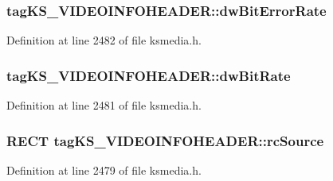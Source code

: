 \subsubsection[{\texorpdfstring{dw\+Bit\+Error\+Rate}{dwBitErrorRate}}]{ tag\+K\+S\+\_\+\+V\+I\+D\+E\+O\+I\+N\+F\+O\+H\+E\+A\+D\+E\+R\+::dw\+Bit\+Error\+Rate}\hypertarget{structtag_k_s___v_i_d_e_o_i_n_f_o_h_e_a_d_e_r_a61ee8d4ae605761206b2f35175e036ac}{}\label{structtag_k_s___v_i_d_e_o_i_n_f_o_h_e_a_d_e_r_a61ee8d4ae605761206b2f35175e036ac}


Definition at line 2482 of file ksmedia.\+h.

\subsubsection[{\texorpdfstring{dw\+Bit\+Rate}{dwBitRate}}]{ tag\+K\+S\+\_\+\+V\+I\+D\+E\+O\+I\+N\+F\+O\+H\+E\+A\+D\+E\+R\+::dw\+Bit\+Rate}\hypertarget{structtag_k_s___v_i_d_e_o_i_n_f_o_h_e_a_d_e_r_a7ab397ba0ef60a0bb449e045d2acca8d}{}\label{structtag_k_s___v_i_d_e_o_i_n_f_o_h_e_a_d_e_r_a7ab397ba0ef60a0bb449e045d2acca8d}


Definition at line 2481 of file ksmedia.\+h.

\subsubsection[{\texorpdfstring{rc\+Source}{rcSource}}]{\setlength{\rightskip}{0pt plus 5cm}R\+E\+CT tag\+K\+S\+\_\+\+V\+I\+D\+E\+O\+I\+N\+F\+O\+H\+E\+A\+D\+E\+R\+::rc\+Source}\hypertarget{structtag_k_s___v_i_d_e_o_i_n_f_o_h_e_a_d_e_r_a26e81c3d7e1672c344c7f1362e3cde50}{}\label{structtag_k_s___v_i_d_e_o_i_n_f_o_h_e_a_d_e_r_a26e81c3d7e1672c344c7f1362e3cde50}


Definition at line 2479 of file ksmedia.\+h.

